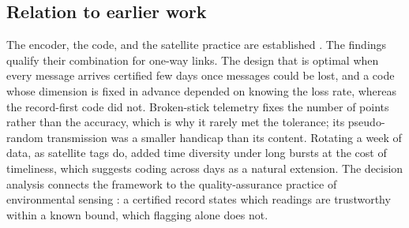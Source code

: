 \subsection{Relation to earlier work}
The encoder, the code, and the satellite practice are established \citep{imai1988,reed1960,boehme2009}. The findings qualify their combination for one-way links. The design that is optimal when every message arrives \citep{deligiannakis2007} certified few days once messages could be lost, and a code whose dimension is fixed in advance depended on knowing the loss rate, whereas the record-first code did not. Broken-stick telemetry \citep{boehme2009,photopoulou2015} fixes the number of points rather than the accuracy, which is why it rarely met the tolerance; its pseudo-random transmission was a smaller handicap than its content. Rotating a week of data, as satellite tags do, added time diversity under long bursts at the cost of timeliness, which suggests coding across days as a natural extension. The decision analysis connects the framework to the quality-assurance practice of environmental sensing \citep{campbell2013,horsburgh2015}: a certified record states which readings are trustworthy within a known bound, which flagging alone does not.

